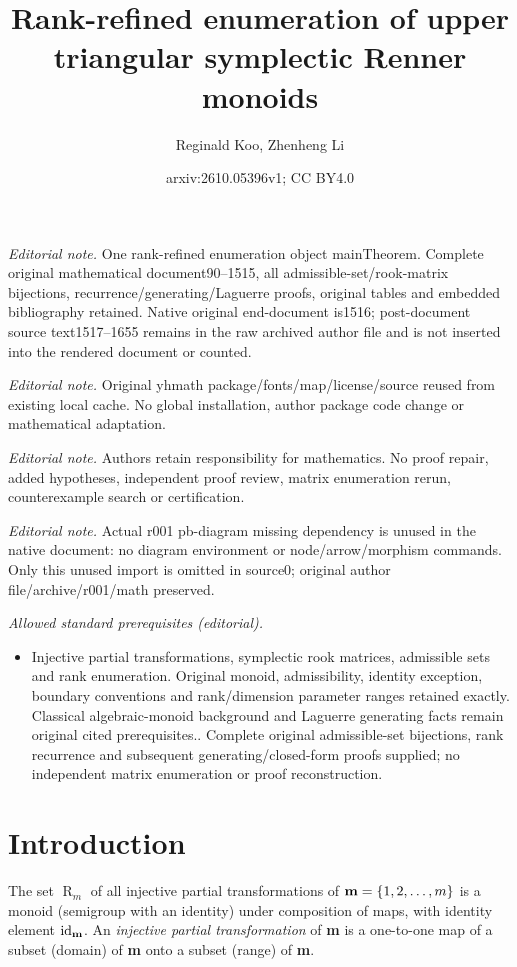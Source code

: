 \documentclass[11pt]{article}
\title{Rank-refined enumeration of upper triangular symplectic Renner monoids}
\author{Reginald Koo, Zhenheng Li}
\date{arxiv:2610.05396v1; CC BY4.0}
\DeclareMathOperator{\id}{id}
\DeclareMathOperator{\R}{R}
\begin{document}
\maketitle
\noindent\textit{Editorial note.} One rank-refined enumeration object mainTheorem. Complete original mathematical document90--1515, all admissible-set/rook-matrix bijections, recurrence/generating/Laguerre proofs, original tables and embedded bibliography retained. Native original end-document is1516; post-document source text1517--1655 remains in the raw archived author file and is not inserted into the rendered document or counted.\par\medskip
\noindent\textit{Editorial note.} Original yhmath package/fonts/map/license/source reused from existing local cache. No global installation, author package code change or mathematical adaptation.\par\medskip
\noindent\textit{Editorial note.} Authors retain responsibility for mathematics. No proof repair, added hypotheses, independent proof review, matrix enumeration rerun, counterexample search or certification.\par\medskip
\noindent\textit{Editorial note.} Actual r001 pb-diagram missing dependency is unused in the native document: no diagram environment or node/arrow/morphism commands. Only this unused import is omitted in source0; original author file/archive/r001/math preserved.\par\medskip
\noindent\textit{Allowed standard prerequisites (editorial).}\begin{itemize}
\item Injective partial transformations, symplectic rook matrices, admissible sets and rank enumeration. Original monoid, admissibility, identity exception, boundary conventions and rank/dimension parameter ranges retained exactly. Classical algebraic-monoid background and Laguerre generating facts remain original cited prerequisites.. Complete original admissible-set bijections, rank recurrence and subsequent generating/closed-form proofs supplied; no independent matrix enumeration or proof reconstruction.
\end{itemize}\medskip
\section{Introduction}

The set $\R_m$ of all injective partial transformations of ${\bf m}=\{1,2,\dots, m\}$ is a monoid (semigroup with an identity) under composition of maps, with identity element $\id_{\bf m}$. An {\em injective partial transformation} of {\bf m} is a one-to-one map of a subset (domain) of {\bf m} onto a subset (range) of {\bf m}. 
\end{document}
